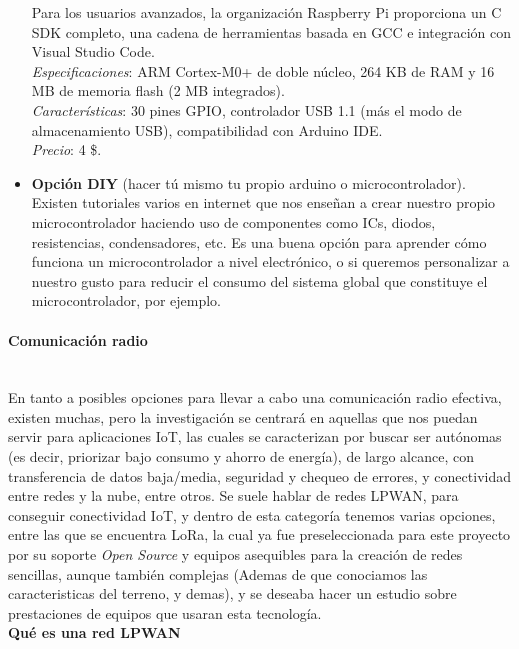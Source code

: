 \documentclass[12pt]{article}
\newcommand{\subsubsubsection}[1]{\paragraph{#1}\mbox{}\\}
\begin{document}
\begin{itemize}
		Para los usuarios avanzados, la organización Raspberry Pi proporciona un C SDK completo, una cadena de herramientas basada en GCC e integración con Visual Studio Code. \\
		
		\textit{Especificaciones}: ARM Cortex-M0+ de doble núcleo, 264 KB de RAM y 16 MB de memoria flash (2 MB integrados). \\
		
		\textit{Características}: 30 pines GPIO, controlador USB 1.1 (más el modo de almacenamiento USB), compatibilidad con Arduino IDE.\\
		
		\textit{Precio}: 4 \$.\\
		
		\item \textbf{Opción DIY} (hacer tú mismo tu propio arduino o microcontrolador). Existen tutoriales varios en internet que nos enseñan a crear nuestro propio microcontrolador haciendo uso de componentes como ICs, diodos, resistencias, condensadores, etc. Es una buena opción para aprender cómo funciona un microcontrolador a nivel electrónico, o si queremos personalizar a nuestro gusto para reducir el consumo del sistema global que constituye el microcontrolador, por ejemplo.\\

	\end{itemize}
	\subsubsubsection{Comunicación radio}
	
	\noindent En tanto a posibles opciones para llevar a cabo una comunicación radio efectiva, existen muchas, pero la investigación se centrará en aquellas que nos puedan servir para aplicaciones IoT, las cuales se caracterizan por buscar ser autónomas (es decir, priorizar bajo consumo y ahorro de energía), de largo alcance, con transferencia de datos baja/media, seguridad y chequeo de errores, y conectividad entre redes y la nube, entre otros. Se suele hablar de redes LPWAN, para conseguir conectividad IoT, y dentro de esta categoría tenemos varias opciones, entre las que se encuentra LoRa, la cual ya fue preseleccionada para este proyecto por su soporte \textit{Open Source} y equipos asequibles para la creación de redes sencillas, aunque también complejas (Ademas de que conociamos las caracteristicas del terreno, y demas), y se deseaba hacer un estudio sobre prestaciones de equipos que usaran esta tecnología.\\
	
	\noindent \textbf{Qué es una red LPWAN} \\
	
\end{document}

